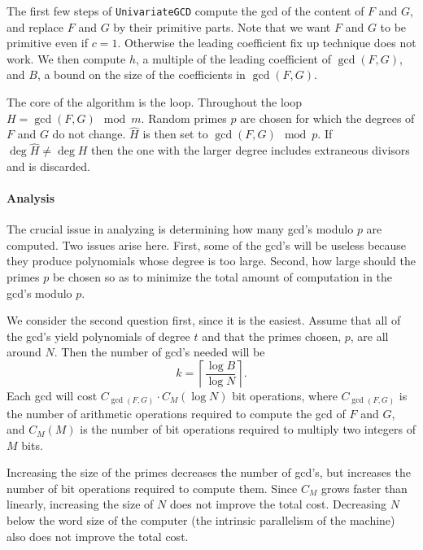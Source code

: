 The first few steps of {\tt UnivariateGCD} compute the {\sc gcd} of the
content of $F$ and $G$, and replace $F$ and $G$ by  their primitive
parts.  Note that we want $F$ and $G$ to be primitive even if $c= 1$.
Otherwise the leading coefficient fix up technique does not work.  We
then compute $h$, a multiple of the leading coefficient of $\gcd(F,
G)$, and $B$, a bound on the size of the coefficients in $\gcd(F, G)$.

The core of the algorithm is the loop.  Throughout the loop $H =
\gcd(F, G) \mod{m}$.  Random primes $p$ are chosen for which the
degrees of $F$ and $G$ do not change.  $\hat{H}$ is then set to
$\gcd(F, G) \mod{p}$.  If $\deg \hat{H} \not= \deg H$ then the one
with the larger degree includes extraneous divisors and is discarded.

\paragraph{Analysis}

The crucial issue in analyzing  is determining how
many {\sc gcd}'s modulo $p$ are computed.  Two issues arise here.
First, some of the {\sc gcd}'s will be useless because they produce
polynomials whose degree is too large.  Second, how large should the
primes $p$ be chosen so as to minimize the total amount of computation
in the {\sc gcd}'s modulo $p$.

We consider the second question first, since it is the easiest.
Assume that all of the {\sc gcd}'s yield polynomials of degree $t$ and
that the primes chosen, $p$, are all around $N$.  Then the number of
{\sc gcd}'s needed will be 
\[
k = \left\lceil \frac{\log B}{\log N} \right\rceil.
\]
Each {\sc gcd} will cost $C_{\gcd(F,G)} \cdot C_{M}(\log N)$ bit
operations, where $C_{\gcd(F,G)}$ is the number of arithmetic
operations required to compute the {\sc gcd} of $F$ and $G$, and
$C_{M}(M)$ is the number of bit operations required to multiply two
integers of $M$ bits.  

Increasing the size of the primes decreases the number of {\sc gcd}'s,
but increases the number of bit operations required to compute them.
Since $C_{M}$ grows faster than linearly, increasing the size of $N$
does not improve the total cost.  Decreasing $N$ below the word size
of the computer (the intrinsic parallelism of the machine) also does
not improve the total cost.

